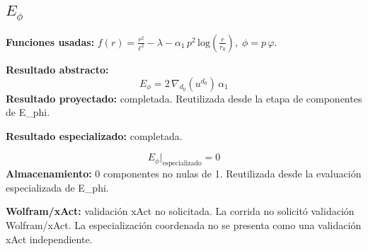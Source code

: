\documentclass[11pt]{article}
\begin{document}
\subsection*{$ E_{\phi} $}
\textbf{Funciones usadas:} $ f\!\left(r\right) = \frac{{r}^{2}}{{\ell}^{2}} - \lambda - \alpha_{1}\,{p}^{2}\,\mathrm{log}\!\left(\frac{r}{r_{0}}\right),\;\phi=p\,\varphi $.\par
\textbf{Resultado abstracto:}
\begin{dmath*}[breakdepth={5}]
E_{\phi} = 2\,\nabla_{d_{0}}\!\left(u{}^{d_{0}}\right)\,\alpha_{1}
\end{dmath*}
\textbf{Resultado proyectado:} completada. Reutilizada desde la etapa de componentes de E\_phi.\par
\textbf{Resultado especializado:} completada.\par
\begin{dmath*}[breakdepth={5}]
E_{\phi}\big|_{\mathrm{especializado}} = 0
\end{dmath*}
\textbf{Almacenamiento:} 0 componentes no nulas de 1. Reutilizada desde la evaluación especializada de E\_phi.\par
\textbf{Wolfram/xAct:} validación xAct no solicitada. La corrida no solicitó validación Wolfram/xAct. La especialización coordenada no se presenta como una validación xAct independiente.\par\medskip
{}
\end{document}
